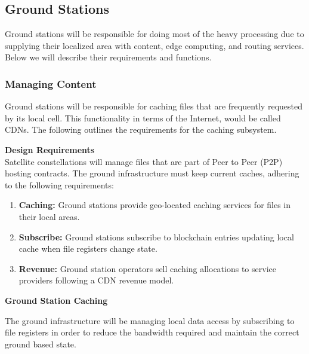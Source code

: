 \documentclass[11pt]{article}
\begin{document}
\bigskip
\subsection{Ground Stations}

Ground stations will be responsible for doing most of the heavy processing due to supplying their localized area with content, edge computing, and routing services.
Below we will describe their requirements and functions.

\subsubsection{Managing Content}

Ground stations will be responsible for caching files that are frequently requested by its local cell.
This functionality in terms of the Internet, would be called CDNs.
The following outlines the requirements for the caching subsystem.

\bigskip
{\noindent\textbf{Design Requirements}} \\

\noindent Satellite constellations will manage files that are part of Peer to Peer (P2P) hosting contracts.
The ground infrastructure must keep current caches, adhering to the following requirements:

\begin{enumerate}
    \item \textbf{Caching:} Ground stations provide geo-located caching services for files in their local areas.
    \item \textbf{Subscribe:} Ground stations subscribe to blockchain entries updating local cache when file registers change state.
    \item \textbf{Revenue:} Ground station operators sell caching allocations to service providers following a CDN revenue model.
\end{enumerate}

\bigskip
{\noindent\textbf{Ground Station Caching}} \\
\label{ground-caching}

\noindent The ground infrastructure will be managing local data access by subscribing to file registers in order to reduce the bandwidth required and maintain the correct ground based state.
\end{document}
